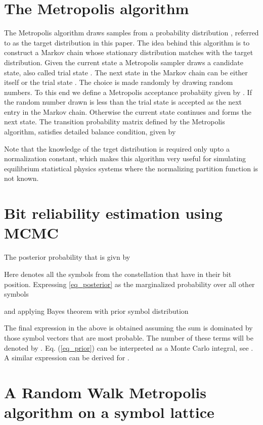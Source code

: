 \documentclass[pre,12pt,aps]{revtex4}
\begin{document}
\section{The Metropolis algorithm}
The Metropolis algorithm \cite{Metropolis} draws samples 
from a probability distribution , referred to as the 
target distribution in this paper. The idea behind this 
algorithm is to construct a Markov chain whose stationary 
distribution matches with the target distribution. 
Given the current state 
 a Metropolis sampler draws  
a candidate state, also called trial state .
The next state in the Markov chain can be either  itself or 
the trial state . The choice is made randomly by drawing random
numbers. To this end we define a Metropolis acceptance probabiity
given by . If the random number 
drawn is less than  the trial state is accepted as the next entry
in the Markov chain. Otherwise the current state continues and forms the 
next state. 
The transition probability matrix  defined by 
the Metropolis algorithm,
satisfies detailed balance 
condition, given by
 									
Note that the knowledge of the trget distribution is required only upto a 
normalization  constant, which makes this algorithm 
very useful for simulating equilibrium statistical physics systems
where the normalizing partition function is not known.


\section{Bit reliability estimation using MCMC} 
The posterior probability that  is givn by

Here  denotes all the symbols from the 
constellation  that have  in their  bit
            position. Expressing \ref{eq_posterior} as the marginalized 
probability over all other symbols
  
and applying Bayes 
theorem with prior symbol distribution

The final expression in the above is obtained assuming the sum 
is dominated by those symbol vectors that are most probable. 
The number of these terms will be denoted by . 
Eq. (\ref{eq_prior}) can  be interpreted as a 
Monte Carlo integral, see \cite{fbzs}. 
A similar expression can be derived for 
. 


\section{A Random Walk Metropolis algorithm on a symbol lattice} 
\end{document}
